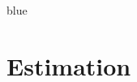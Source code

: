 \documentclass[11pt]{article}
\newtheorem{theorem}{Theorem}[section]
\theoremstyle{definition}
\theoremstyle{remark}
\newcommand{\one}{\mathbf 1}
\newcommand{\supp}{\operatorname{supp}}
\newcommand{\Exp}{\operatorname{Exp}}
\newenvironment{AIwritten}{\begin{color}{blue}}{\end{color}}
\begin{document}
\begin{AIwritten}
\section{Estimation}

%	
%	
%		
%		
%	
%
%	
%	
%	
%	



\end{AIwritten}
\end{document}
